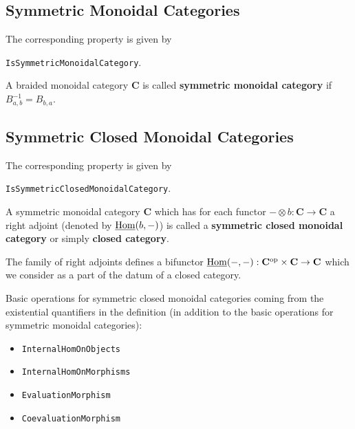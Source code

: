 \subsection{Symmetric Monoidal Categories}

\begin{documentation}
 The corresponding \GAP property is given by
 \begin{center}
  \texttt{IsSymmetricMonoidalCategory}.  
 \end{center}
\end{documentation}

\begin{definition}
 A braided monoidal category $\mathbf{C}$ is called \textbf{symmetric monoidal category}
 if $B_{a,b}^{-1} = B_{b,a}$.
\end{definition}


\subsection{Symmetric Closed Monoidal Categories}

\begin{documentation}
 The corresponding \GAP property is given by
 \begin{center}
  \texttt{IsSymmetricClosedMonoidalCategory}.  
 \end{center}
\end{documentation}

\begin{definition}
 A symmetric monoidal category $\mathbf{C}$
 which has for each functor $- \otimes b: \mathbf{C} \rightarrow \mathbf{C}$
 a right adjoint (denoted by $\underline{\operatorname{\mathrm{Hom}}}(b,-)$)
 is called a \textbf{symmetric closed monoidal category} or simply \textbf{closed category}.
\end{definition}

\begin{remark}
 The family of right adjoints defines a bifunctor
 $\underline{\operatorname{\mathrm{Hom}}}(-,-): \mathbf{C}^{\mathrm{op}} \times \mathbf{C} \rightarrow \mathbf{C}$
 which we consider as a part of the datum of a closed category.
\end{remark}


Basic operations for symmetric closed monoidal categories coming from the existential quantifiers
in the definition
(in addition to the basic operations for symmetric monoidal categories):
\begin{itemize}
  \item \texttt{InternalHomOnObjects}
  \item \texttt{InternalHomOnMorphisms}
  \item \texttt{EvaluationMorphism}
  \item \texttt{CoevaluationMorphism}
\end{itemize}

